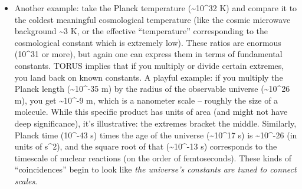 \documentclass[
]{article}
\begin{document}
\begin{itemize}
  An especially impressive harmonization is how the \textbf{extremes of
  scale multiply or relate to give moderate values}. Consider the age of
  the universe versus the Planck time:
  T\textless sub\textgreater U\textless/sub\textgreater/t\textless sub\textgreater P\textless/sub\textgreater{}
  \textasciitilde{} 8×10\^{}60. If this were just a random huge number,
  one might shrug. But TORUS factorizes this: 8×10\^{}60 \approx (10\^{}2) ×
  (10\^{}38) × (10\^{}20)\hspace{0pt}. Each factor has a physical
  meaning: 10\^{}2 is \textasciitilde137, close to 1/\alpha (the 0D
  coupling's inverse)\hspace{0pt}; 10\^{}38 is in the ballpark of the
  ratio of electromagnetic to gravitational coupling for typical
  particles (since gravity is \textasciitilde10\^{}38 times
  weaker)\hspace{0pt}; 10\^{}20 might relate to number of particles or
  entropy in a large system. The exact interpretation can vary, but the
  point remains -- these large dimensionless numbers decompose into
  \textbf{products of fundamental ratios} rather than being sui generis.
  TORUS thereby \textbf{demystifies large numbers}: they're harmonics of
  the smaller numbers. In music, this is like hearing a very low bass
  note and realizing it's actually a combination of higher-frequency
  harmonics you already know. By showing that a huge number like
  10\^{}60 can come from \alpha\^{}-1 (\textasciitilde10\^{}2) times other
  known quantities, TORUS suggests the cosmic scale is in resonance with
  the quantum scales\hspace{0pt}.
\item
  Another example: take the Planck temperature (\textasciitilde10\^{}32
  K) and compare it to the coldest meaningful cosmological temperature
  (like the cosmic microwave background \textasciitilde3 K, or the
  effective ``temperature'' corresponding to the cosmological constant
  which is extremely low). These ratios are enormous (10\^{}31 or more),
  but again one can express them in terms of fundamental constants.
  TORUS implies that if you multiply or divide certain extremes, you
  land back on known constants. A playful example: if you multiply the
  Planck length (\textasciitilde10\^{}-35 m) by the radius of the
  observable universe (\textasciitilde10\^{}26 m), you get
  \textasciitilde10\^{}-9 m, which is a nanometer scale -- roughly the
  size of a molecule. While this specific product has units of area (and
  might not have deep significance), it's illustrative: the extremes
  bracket the middle. Similarly, Planck time (10\^{}-43 s) times the age
  of the universe (\textasciitilde10\^{}17 s) is
  \textasciitilde10\^{}-26 (in units of s\^{}2), and the square root of
  that (\textasciitilde10\^{}-13 s) corresponds to the timescale of
  nuclear reactions (on the order of femtoseconds). These kinds of
  ``coincidences'' begin to look like \emph{the universe's constants are
  tuned to connect scales}.
\end{itemize}
\end{document}
